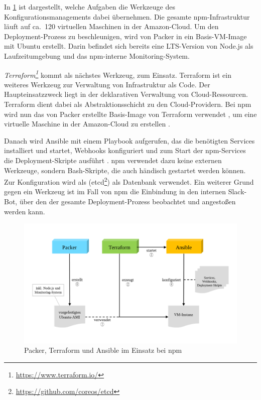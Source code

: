 In \cref{fig:configurationtools-npm} ist dargestellt, welche Aufgaben die Werkzeuge des Konfigurationsmanagements dabei übernehmen.
Die gesamte npm-Infrastruktur läuft auf ca.\ 120 virtuellen Maschinen in der Amazon-Cloud.
Um den Deployment-Prozess zu beschleunigen, wird von Packer in  ein Basis-VM-Image mit Ubuntu erstellt.
Darin befindet sich bereits eine LTS-Version von Node.js als Laufzeitumgebung und das npm-interne Monitoring-System.

\emph{Terraform\footnote{\url{https://www.terraform.io/}}} kommt als nächstes Werkzeug, zum Einsatz.
Terraform ist ein weiteres Werkzeug zur Verwaltung von Infrastruktur als Code.
Der Haupteinsatzzweck liegt in der deklarativen Verwaltung von Cloud-Ressourcen.
Terraform dient dabei als Abstraktionsschicht zu den Cloud-Providern.
Bei npm wird nun das von Packer erstellte Basis-Image von Terraform verwendet , um eine virtuelle Maschine in der Amazon-Cloud zu erstellen .

Danach wird Ansible mit einem Playbook aufgerufen, das die benötigten Services installiert und startet, Webhooks konfiguriert und zum Start der npm-Services die Deployment-Skripte ausführt .
npm verwendet dazu keine externen Werkzeuge, sondern Bash-Skripte, die auch händisch gestartet werden können.
Zur Konfiguration wird als (etcd\footnote{\url{https://github.com/coreos/etcd}}) als Datenbank verwendet.
Ein weiterer Grund gegen ein Werkzeug ist im Fall von npm die Einbindung in den internen Slack-Bot, über den der gesamte Deployment-Prozess beobachtet und angestoßen werden kann.

\begin{figure}[htbp]
    \centering
    \includegraphics[width=0.9\linewidth,clip]{images/npm-deployment}
    \caption{Packer, Terraform und Ansible im Einsatz bei npm}
\label{fig:configurationtools-npm}
\end{figure}

